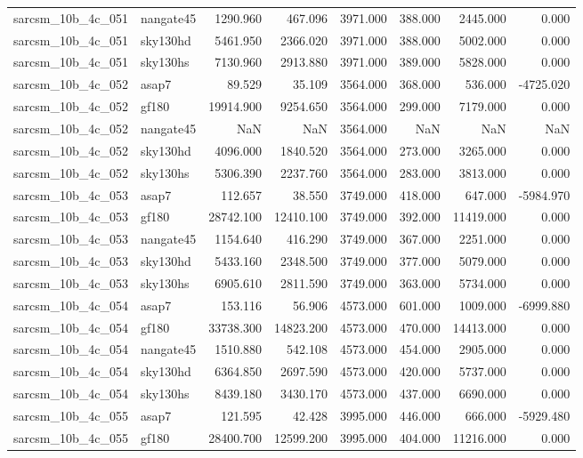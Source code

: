 \begin{tabular}{llrrrrrr}
sarcsm\_10b\_4c\_051 & nangate45 & 1290.960 & 467.096 & 3971.000 & 388.000 & 2445.000 & 0.000 \\
sarcsm\_10b\_4c\_051 & sky130hd & 5461.950 & 2366.020 & 3971.000 & 388.000 & 5002.000 & 0.000 \\
sarcsm\_10b\_4c\_051 & sky130hs & 7130.960 & 2913.880 & 3971.000 & 389.000 & 5828.000 & 0.000 \\
sarcsm\_10b\_4c\_052 & asap7 & 89.529 & 35.109 & 3564.000 & 368.000 & 536.000 & -4725.020 \\
sarcsm\_10b\_4c\_052 & gf180 & 19914.900 & 9254.650 & 3564.000 & 299.000 & 7179.000 & 0.000 \\
sarcsm\_10b\_4c\_052 & nangate45 & NaN & NaN & 3564.000 & NaN & NaN & NaN \\
sarcsm\_10b\_4c\_052 & sky130hd & 4096.000 & 1840.520 & 3564.000 & 273.000 & 3265.000 & 0.000 \\
sarcsm\_10b\_4c\_052 & sky130hs & 5306.390 & 2237.760 & 3564.000 & 283.000 & 3813.000 & 0.000 \\
sarcsm\_10b\_4c\_053 & asap7 & 112.657 & 38.550 & 3749.000 & 418.000 & 647.000 & -5984.970 \\
sarcsm\_10b\_4c\_053 & gf180 & 28742.100 & 12410.100 & 3749.000 & 392.000 & 11419.000 & 0.000 \\
sarcsm\_10b\_4c\_053 & nangate45 & 1154.640 & 416.290 & 3749.000 & 367.000 & 2251.000 & 0.000 \\
sarcsm\_10b\_4c\_053 & sky130hd & 5433.160 & 2348.500 & 3749.000 & 377.000 & 5079.000 & 0.000 \\
sarcsm\_10b\_4c\_053 & sky130hs & 6905.610 & 2811.590 & 3749.000 & 363.000 & 5734.000 & 0.000 \\
sarcsm\_10b\_4c\_054 & asap7 & 153.116 & 56.906 & 4573.000 & 601.000 & 1009.000 & -6999.880 \\
sarcsm\_10b\_4c\_054 & gf180 & 33738.300 & 14823.200 & 4573.000 & 470.000 & 14413.000 & 0.000 \\
sarcsm\_10b\_4c\_054 & nangate45 & 1510.880 & 542.108 & 4573.000 & 454.000 & 2905.000 & 0.000 \\
sarcsm\_10b\_4c\_054 & sky130hd & 6364.850 & 2697.590 & 4573.000 & 420.000 & 5737.000 & 0.000 \\
sarcsm\_10b\_4c\_054 & sky130hs & 8439.180 & 3430.170 & 4573.000 & 437.000 & 6690.000 & 0.000 \\
sarcsm\_10b\_4c\_055 & asap7 & 121.595 & 42.428 & 3995.000 & 446.000 & 666.000 & -5929.480 \\
sarcsm\_10b\_4c\_055 & gf180 & 28400.700 & 12599.200 & 3995.000 & 404.000 & 11216.000 & 0.000 \\

\end{tabular}
